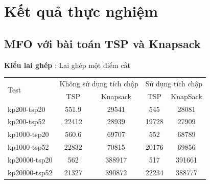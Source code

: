 \documentclass[a4paper,12pt]{report}
\begin{document}

\section{Kết quả thực nghiệm}

\subsection{MFO với bài toán TSP và Knapsack}
\textbf{Kiểu lai ghép} : Lai ghép một điểm cắt


\begin{longtable}{|l |c |c |c |c|}
\hline
\multirow{2}{*}{Test} 
& \multicolumn{2}{c|}{Không sử dụng tích chập} &\multicolumn{2}{|c|}{Sử dụng tích chập} \\
\cline{2-5}
&TSP & Knapsack & TSP & KnapSack \\
\hline
kp200-tsp20  & 551.9&29541 &545 &28081 
\\ \hline
kp200-tsp52&22412 &28939&19728 &27909 \\ \hline
kp1000-tsp20 &560.6&69707&552&68789 \\ \hline
kp1000-tsp52 &22832&70815&20176&69856 \\ \hline
kp20000-tsp20 &562&388917&517 &391661 \\ \hline
kp20000-tsp52 &21327&390872&22234& 388777\\ \hline
\end{longtable}
\end{document}
